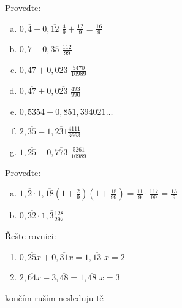 \begin{example}[SÚM 107/21]
  Proveďte:
  \begin{enumerate}[a.]
    \item $0,\overline{4}+0,\overline{12}$ \hfill $\frac{4}{9}+\frac{12}{9}=\frac{16}{9}$
    \item $0,\overline{7}+0,\overline{35}$  \hfill $\frac{112}{99}$
    \item $0,\overline{47}+0,\overline{023}$ \hfill $\frac{5470}{10989}$
    \item $0,\overline{47}+0,0\overline{23}$ \hfill $\frac{493}{990}$
    \item $0,5\overline{354}+0,\overline{85}$\hfill $1,394021\dots$
    \item $2,\overline{35}-1,\overline{231}$\hfill$ \frac{4111}{3663}$
    \item $1,\overline{25}-0,\overline{773}$ \hfill $\frac{5261}{10989}$
  \end{enumerate}
\end{example}

\begin{example}[SÚM 107/22*]
  Proveďte:
  \begin{enumerate}[a.]
    \item $1,\overline{2}\cdot 1,\overline{18}$\hfill $\left(1+\frac{2}{9}\right)\left(1+\frac{18}{99}\right)=\frac{11}{9}\cdot \frac{117}{99}=\frac{13}{9}$
    \item $0,\overline{32}\cdot 1,\overline{3}$\hfill $\frac{128}{297}$
  \end{enumerate}
\end{example}

\begin{example}[SÚM 107/23*]
  Řešte rovnici:
  \begin{enumerate}
    \item $0,\overline{25}x + 0,\overline{31}x = 1,\overline{13}$ \hfill $x=2$
    \item $2,\overline{64}x - 3,\overline{48} = 1,\overline{48}$  \hfill $x = 3$
  \end{enumerate}
\end{example}

končím ruším nesleduju tě
